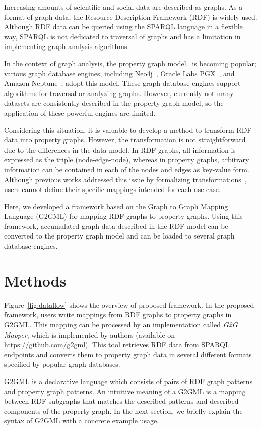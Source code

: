 \documentclass[runningheads]{llncs}
\begin{document}
Increasing amounts of scientific and social data are described as graphs. As a format of graph data, the Resource Description Framework (RDF) is widely used. Although RDF data can be queried using the SPARQL language in a flexible way, SPARQL is not dedicated to traversal of graphs and has a limitation in implementing graph analysis algorithms.

In the context of graph analysis, the property graph model~\cite{angles} is becoming popular; various graph database engines, including Neo4j~\cite{neo4j}, Oracle Labs PGX~\cite{pgx}, and Amazon Neptune~\cite{neptune}, adopt this model. These graph database engines support algorithms for traversal or analyzing graphs. However, currently not many datasets are consistently described in the property graph model, so the application of these powerful engines are limited.

Considering this situation, it is valuable to develop a method to transform RDF data into property graphs. However, the transformation is not straightforward due to the differences in the data model. 
In RDF graphs, all information is expressed as the triple (node-edge-node), whereas in property graphs, arbitrary information can be contained in each of the nodes and edges as key-value form. 
Although previous works addressed this issue by formalizing transformations~\cite{hartig},
users cannot define their specific mappings intended for each use case.

Here, we developed a framework based on the Graph to Graph Mapping Language (G2GML) for mapping RDF graphs to property graphs. Using this framework, accumulated graph data described in the RDF model can be converted to the property graph model and can be loaded to several graph database engines. 

\section{Methods}

Figure~\ref{fig:dataflow} shows the overview of proposed framework.
In the proposed framework, users write mappings from RDF graphs to property graphs in G2GML.
This mapping can be processed by an implementation called \textit{G2G Mapper}, which is implemented by authors (available on \url{https://github.com/g2gml}). This tool retrieves RDF data from SPARQL endpoints and converts them to property graph data in several different formats specified by popular graph databases.

G2GML is a declarative language which consists of pairs of RDF graph patterns and property graph patterns. 
An intuitive meaning of a G2GML is a mapping between RDF subgraphs that matches the described patterns and described components of the property graph. In the next section, we briefly explain the syntax of G2GML with a concrete example usage.
\end{document}
